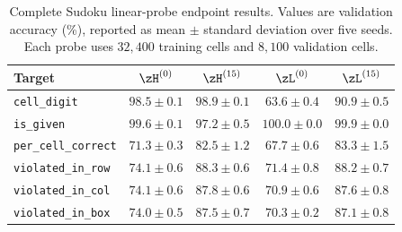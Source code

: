 \begin{table}[t]
\centering
\caption{Complete Sudoku linear-probe endpoint results. Values are validation accuracy (\%), reported as mean $\pm$ standard deviation over five seeds. Each probe uses $32{,}400$ training cells and $8{,}100$ validation cells.}
\label{tab:sudoku_probe_full}
\vskip 0.1in
\small
\begin{tabular}{@{}lcccc@{}}
\toprule
\textbf{Target} & $\zH^{(0)}$ & $\zH^{(15)}$ & $\zL^{(0)}$ & $\zL^{(15)}$ \\
\midrule
\texttt{cell\_digit} & $98.5 \pm 0.1$ & $98.9 \pm 0.1$ & $63.6 \pm 0.4$ & $90.9 \pm 0.5$ \\
\texttt{is\_given} & $99.6 \pm 0.1$ & $97.2 \pm 0.5$ & $100.0 \pm 0.0$ & $99.9 \pm 0.0$ \\
\texttt{per\_cell\_correct} & $71.3 \pm 0.3$ & $82.5 \pm 1.2$ & $67.7 \pm 0.6$ & $83.3 \pm 1.5$ \\
\texttt{violated\_in\_row} & $74.1 \pm 0.6$ & $88.3 \pm 0.6$ & $71.4 \pm 0.8$ & $88.2 \pm 0.7$ \\
\texttt{violated\_in\_col} & $74.1 \pm 0.6$ & $87.8 \pm 0.6$ & $70.9 \pm 0.6$ & $87.6 \pm 0.8$ \\
\texttt{violated\_in\_box} & $74.0 \pm 0.5$ & $87.5 \pm 0.7$ & $70.3 \pm 0.2$ & $87.1 \pm 0.8$ \\
\bottomrule
\end{tabular}
\end{table}

